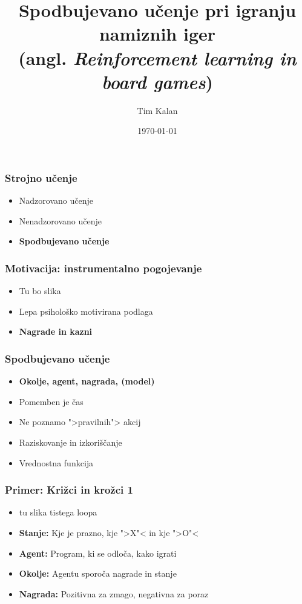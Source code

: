 \documentclass[14pt]{beamer}    %
\author{Tim Kalan}
\institute[FMF]{Fakulteta za matematiko in fiziko}
\title{
    Spodbujevano učenje pri igranju namiznih iger \\ 
    \large (angl. \textit{Reinforcement learning in board games})}
\date{\today}
\begin{document}
\begin{frame}
    \titlepage
\end{frame}


\begin{frame}
    \frametitle{Strojno učenje}
    \begin{itemize}
        \item Nadzorovano učenje
        \item Nenadzorovano učenje
        \item \textbf{Spodbujevano učenje}
    \end{itemize}
\end{frame}


\begin{frame}
    \frametitle{Motivacija: instrumentalno pogojevanje}
    \begin{itemize}
        \item Tu bo slika
        \item Lepa psihološko motivirana podlaga
        \item \textbf{Nagrade in kazni} 
    \end{itemize}
\end{frame}


\begin{frame}
    \frametitle{Spodbujevano učenje}
    \begin{itemize}
        \item \textbf{Okolje, agent, nagrada, (model)}
        \item Pomemben je čas
        \item Ne poznamo ">pravilnih"> akcij
        \item Raziskovanje in izkoriščanje
        \item Vrednostna funkcija
    \end{itemize}
\end{frame}


\begin{frame}
    \frametitle{Primer: Križci in krožci 1}
    \begin{itemize}
        \item tu slika tistega loopa
        \item \textbf{Stanje:} Kje je prazno, kje ">X"< in kje ">O"<
        \item \textbf{Agent:} Program, ki se odloča, kako igrati
        \item \textbf{Okolje:} Agentu sporoča nagrade in stanje
        \item \textbf{Nagrada:} Pozitivna za zmago, negativna za poraz
    \end{itemize}
\end{frame}
\end{document}
